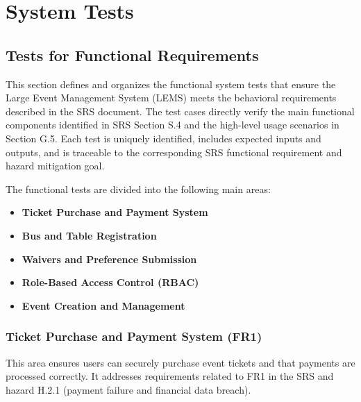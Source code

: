 \documentclass[12pt, titlepage]{article}
\begin{document}


\section{System Tests}


\subsection{Tests for Functional Requirements}

This section defines and organizes the functional system tests that ensure the Large Event Management System (LEMS) meets the behavioral requirements described in the SRS document. The test cases directly verify the main functional components identified in SRS Section S.4 and the high-level usage scenarios in Section G.5.  
Each test is uniquely identified, includes expected inputs and outputs, and is traceable to the corresponding SRS functional requirement and hazard mitigation goal.

The functional tests are divided into the following main areas:
\begin{itemize}
    \item \textbf{Ticket Purchase and Payment System}
    \item \textbf{Bus and Table Registration}
    \item \textbf{Waivers and Preference Submission}
    \item \textbf{Role-Based Access Control (RBAC)}
    \item \textbf{Event Creation and Management}
\end{itemize}

\subsubsection{Ticket Purchase and Payment System (FR1)}

This area ensures users can securely purchase event tickets and that payments are processed correctly. It addresses requirements related to FR1 in the SRS and hazard H.2.1 (payment failure and financial data breach).
\end{document}
